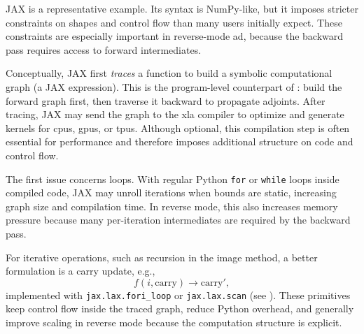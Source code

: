 JAX is a representative example. Its syntax is NumPy-like, but it imposes stricter constraints on shapes and control flow than many users initially expect. These constraints are especially important in reverse-mode \gls{ad}, because the backward pass requires access to forward intermediates.

Conceptually, JAX first \emph{traces} a function to build a symbolic computational graph (a JAX expression). This is the program-level counterpart of : build the forward graph first, then traverse it backward to propagate adjoints. After tracing, JAX may send the graph to the \gls{xla} compiler to optimize and generate kernels for \glspl{cpu}, \glspl{gpu}, or \glspl{tpu}. Although optional, this compilation step is often essential for performance and therefore imposes additional structure on code and control flow.

The first issue concerns loops. With regular Python \texttt{for} or \texttt{while} loops inside compiled code, JAX may unroll iterations when bounds are static, increasing graph size and compilation time. In reverse mode, this also increases memory pressure because many per-iteration intermediates are required by the backward pass.

For iterative operations, such as recursion in the image method, a better formulation is a carry update, e.g.,
\begin{equation}
  f(i,\text{carry})\rightarrow\text{carry}',
\end{equation}
implemented with \texttt{jax.lax.fori\_loop} or \texttt{jax.lax.scan} (see ). These primitives keep control flow inside the traced graph, reduce Python overhead, and generally improve scaling in reverse mode because the computation structure is explicit.

\begin{marginlisting}
  \caption{JAX's alternative to the Python \texttt{for} loop.}
  \inputminted[firstline=31,lastline=44]{python}{codes/margin/jax-control-flow.py}
\end{marginlisting}

\begin{marginlisting}
  \caption{JAX's alternative to the Python \texttt{if} statement.}
  \inputminted[firstline=13,lastline=24]{python}{codes/margin/jax-control-flow.py}
\end{marginlisting}

